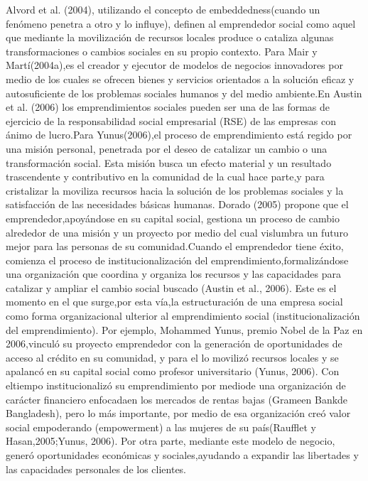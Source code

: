 \documentclass{memoir}
\begin{document}
Alvord  et  al.  (2004),  utilizando  el  concepto  de embeddedness(cuando un fenómeno penetra a otro y lo influye), definen al emprendedor social como aquel que mediante la movilización de recursos locales produce o cataliza algunas transformaciones o cambios sociales en su propio contexto. Para Mair y Martí(2004a),es el creador y ejecutor de modelos de negocios innovadores por medio de los cuales se ofrecen bienes y servicios orientados a la solución eficaz y autosuficiente de los problemas sociales humanos y del medio ambiente.En Austin et al. (2006) los emprendimientos sociales pueden ser una de las formas de ejercicio de la responsabilidad social empresarial (RSE) de las empresas con ánimo de lucro.Para Yunus(2006),el proceso de emprendimiento está regido por una misión personal, penetrada por el deseo de catalizar un cambio o una transformación social. Esta misión busca un efecto material y un resultado trascendente y contributivo en la comunidad de la cual hace parte,y para cristalizar la moviliza recursos hacia la solución de los problemas sociales y la satisfacción de las necesidades básicas humanas. Dorado (2005) propone que el emprendedor,apoyándose en su capital social, gestiona un proceso de cambio alrededor de una misión y un proyecto por medio del cual vislumbra un futuro mejor para las personas de su comunidad.Cuando el emprendedor tiene éxito, comienza el proceso de institucionalización del emprendimiento,formalizándose una organización que coordina y organiza los recursos y las capacidades para catalizar y ampliar el cambio social buscado (Austin et al., 2006). Este es el momento en el que surge,por esta vía,la estructuración de una empresa social como forma organizacional ulterior  al  emprendimiento  social  (institucionalización  del  emprendimiento).  Por  ejemplo,  Mohammed Yunus, premio Nobel de la Paz en 2006,vinculó su proyecto emprendedor con la generación de oportunidades de acceso al crédito en su comunidad, y para el lo movilizó recursos locales y se apalancó en su capital social como profesor universitario (Yunus, 2006). Con eltiempo institucionalizó su emprendimiento por mediode  una  organización  de  carácter  financiero  enfocadaen los mercados de rentas bajas (Grameen Bankde Bangladesh), pero lo más importante, por medio de esa organización creó valor social empoderando (empowerment) a las mujeres de su país(Raufflet y Hasan,2005;Yunus, 2006). Por otra parte, mediante este modelo de negocio, generó oportunidades económicas y sociales,ayudando a expandir las libertades y las capacidades personales de los clientes.
\end{document}
